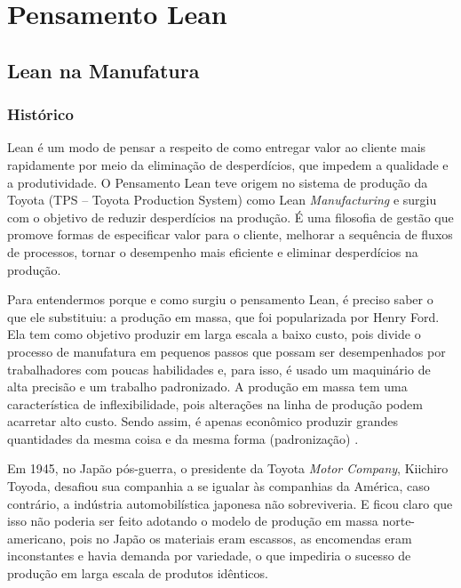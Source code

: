 

\chapter[Pensamento Lean]{Pensamento Lean}



\section[Lean na Manufatura]{Lean na Manufatura}

\subsection[Histórico]{Histórico}

Lean é um modo de pensar a respeito de como entregar valor ao cliente mais rapidamente por meio da eliminação de desperdícios, que impedem a qualidade e a produtividade. O Pensamento Lean teve origem no sistema de produção da Toyota (TPS – Toyota Production System) como Lean \textit{Manufacturing} e surgiu com o objetivo de reduzir desperdícios na produção. É uma filosofia de gestão que promove formas de especificar valor para o cliente, melhorar a sequência de fluxos de processos, tornar o desempenho mais eficiente e eliminar desperdícios na produção. 

Para entendermos porque e como surgiu o pensamento Lean, é preciso saber o que ele substituiu: a produção em massa, que foi popularizada por Henry Ford. Ela tem como objetivo produzir em larga escala a baixo custo, pois divide o processo de manufatura em pequenos passos que possam ser desempenhados por trabalhadores com poucas habilidades e, para isso, é usado um maquinário de alta precisão e um trabalho padronizado. A produção em massa tem uma característica de inflexibilidade, pois alterações na linha de produção podem acarretar alto custo. Sendo assim, é apenas econômico produzir grandes quantidades da mesma coisa e da mesma forma (padronização) \cite{hibbs2009}. 

Em 1945, no Japão pós-guerra, o presidente da Toyota \textit{Motor Company}, Kiichiro Toyoda, desafiou sua companhia a se igualar às companhias da América, caso contrário, a indústria automobilística japonesa não sobreviveria. E ficou claro que isso não poderia ser feito adotando o modelo de produção em massa norte-americano, pois no Japão os materiais eram escassos, as encomendas eram inconstantes e havia demanda por variedade, o que impediria o sucesso de produção em larga escala de produtos idênticos. 

